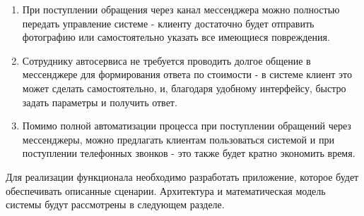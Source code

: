 \begin{enumerate}[label=\arabic*.]
    \item При поступлении обращения через канал мессенджера можно полностью передать управление системе - клиенту достаточно будет отправить фотографию или самостоятельно указать все имеющиеся повреждения.
    \item Сотруднику автосервиса не требуется проводить долгое общение в мессенджере для формирования ответа по стоимости - в системе клиент это может сделать самостоятельно, и, благодаря удобному интерфейсу, быстро задать параметры и получить ответ.
    \item Помимо полной автоматизации процесса при поступлении обращений через мессенджеры, можно предлагать клиентам пользоваться системой и при поступлении телефонных звонков - это также будет кратно экономить время.
\end{enumerate}

Для реализации функционала необходимо разработать приложение, которое будет обеспечивать описанные сценарии. Архитектура и математическая модель системы будут рассмотрены в следующем разделе.

